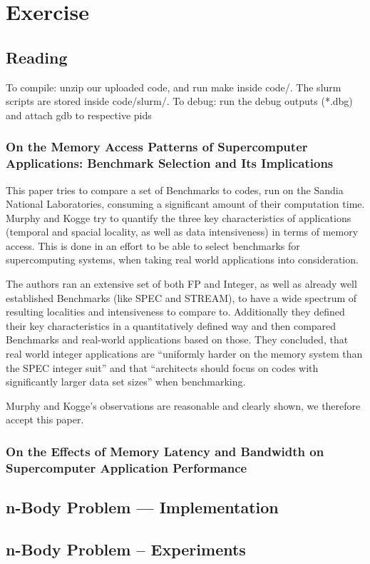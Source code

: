 \documentclass[]{scrartcl}
\newcommand{\exercise}{Exercise \thesection}
\begin{document}
\section*{\exercise}

\subsection{Reading}
To compile: unzip our uploaded code, and run make inside code/. The slurm scripts are stored
inside code/slurm/.
To debug: run the debug outputs (*.dbg) and attach gdb to respective pids

\subsubsection{On the Memory Access Patterns of Supercomputer Applications: Benchmark Selection and Its Implications}
This paper tries to compare a set of Benchmarks to codes, run on the Sandia National Laboratories, consuming a significant amount of their computation time.
Murphy and Kogge try to quantify the three key characteristics of applications (temporal and spacial locality, as well as data intensiveness) in terms of memory access.
This is done in an effort to be able to select benchmarks for supercomputing systems, when taking real world applications into consideration.

The authors ran an extensive set of both FP and Integer, as well as already well established Benchmarks (like SPEC and STREAM), to have a wide spectrum of resulting localities and intensiveness to compare to.
Additionally they defined their key characteristics in a quantitatively defined way and then compared Benchmarks and real-world applications based on those.
They concluded, that real world integer applications are ``uniformly harder on the memory system than the SPEC integer suit'' and that ``architects should focus on codes with significantly larger data set sizes'' when benchmarking.

Murphy and Kogge's observations are reasonable and clearly shown, we therefore accept this paper.


\subsubsection{On the Effects of Memory Latency and Bandwidth on Supercomputer Application Performance}

\subsection{n-Body Problem --- Implementation}
\subsection{n-Body Problem – Experiments}
\end{document}
